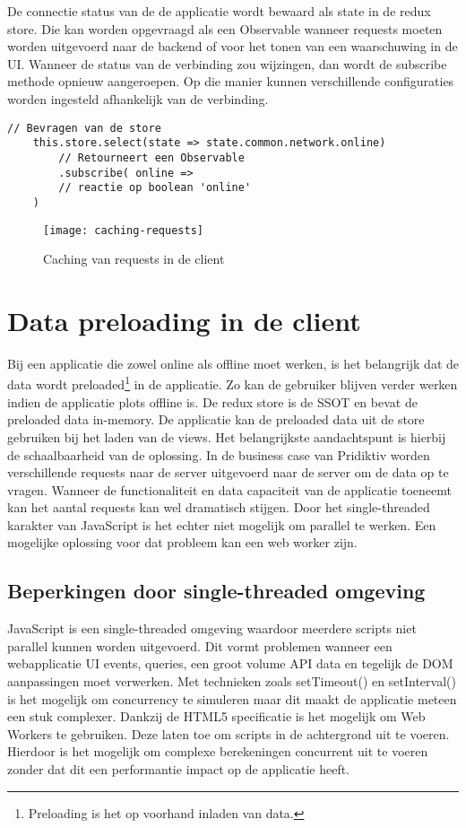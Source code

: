 De connectie status van de de applicatie wordt bewaard als state in de redux store. Die kan worden opgevraagd als een Observable wanneer requests moeten worden uitgevoerd naar de backend of voor het tonen van een waarschuwing in de UI. Wanneer de status van de verbinding zou wijzingen, dan wordt de subscribe methode opnieuw aangeroepen. Op die manier kunnen verschillende configuraties worden ingesteld afhankelijk van de verbinding.

\begin{lstlisting}[caption=Opvragen van de status van de verbinding aan de hand van de redux store]
	// Bevragen van de store
	this.store.select(state => state.common.network.online)
		// Retourneert een Observable
		.subscribe( online => 
		// reactie op boolean 'online'
	)
\end{lstlisting}
		
\begin{figure}[h]
\caption{Caching van requests in de client}
\centering
\texttt{[image: caching-requests]}
\end{figure}

\section{Data preloading in de client}
Bij een applicatie die zowel online als offline moet werken, is het belangrijk dat de data wordt preloaded\footnote{Preloading is het op voorhand inladen van data.} in de applicatie. Zo kan de gebruiker blijven verder werken indien de applicatie plots offline is. De redux store is de SSOT en bevat de preloaded data in-memory. De applicatie kan de preloaded data uit de store gebruiken bij het laden van de views.
 Het belangrijkste aandachtspunt is hierbij de schaalbaarheid van de oplossing. In de business case van Pridiktiv worden verschillende requests naar de server uitgevoerd naar de server om de data op te vragen. Wanneer de functionaliteit en data capaciteit van de applicatie toeneemt kan het aantal requests kan wel dramatisch stijgen. Door het single-threaded karakter van JavaScript is het echter niet mogelijk om parallel te werken. Een mogelijke oplossing voor dat probleem kan een web worker\autocite{webworker-explained} zijn.
 
\subsection{Beperkingen door single-threaded omgeving}
JavaScript is een single-threaded omgeving waardoor meerdere scripts niet parallel kunnen worden uitgevoerd. Dit vormt problemen wanneer een webapplicatie UI events, queries, een groot volume API data en tegelijk de DOM aanpassingen moet verwerken. Met technieken zoals setTimeout() en setInterval() is het mogelijk om concurrency te simuleren maar dit maakt de applicatie meteen een stuk complexer. Dankzij de HTML5 specificatie is het mogelijk om Web Workers te gebruiken. Deze laten toe om scripts in de achtergrond uit te voeren. Hierdoor is het mogelijk om complexe berekeningen concurrent uit te voeren zonder dat dit een performantie impact op de applicatie heeft.

